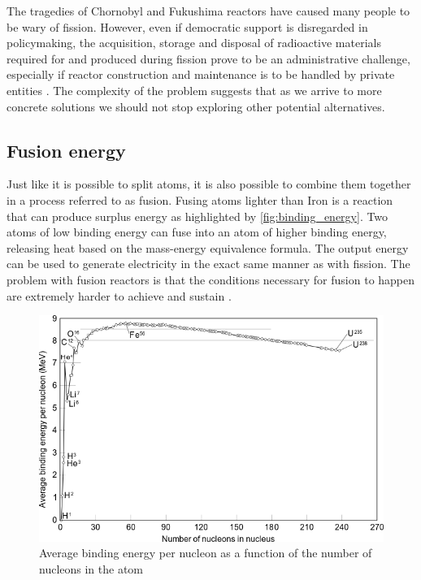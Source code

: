   The tragedies of Chornobyl and Fukushima reactors
  have caused many people to be wary of fission. However, even if
  democratic support is disregarded in policymaking, the acquisition,
  storage and disposal of radioactive materials required for and produced 
  during fission prove to be an administrative challenge, especially 
  if reactor construction and maintenance is to be handled
  by private entities \cite{fission_tech_and_current_issues}. 
  The complexity of the problem suggests that 
  as we arrive to more concrete solutions we 
  should not stop exploring other potential alternatives.

\subsection{Fusion energy}

  Just like it is possible to split atoms, it is also possible to
  combine them together in a process referred to as fusion. 
  Fusing atoms lighter than Iron is a reaction that 
  can produce surplus energy as highlighted by \autoref{fig:binding_energy}.
  Two atoms of low binding energy can fuse into an atom of higher 
  binding energy, releasing heat based on the mass-energy equivalence formula.
  The output energy can be used to generate electricity in
  the exact same manner as with fission. 
  The problem with fusion reactors is that the conditions necessary
  for fusion to happen are extremely harder to achieve and sustain 
  \cite{structural_materials_fusion}.
	\begin{figure}[H]
	  \centering
	  \includegraphics[width=.90\linewidth]{media/binding_energy.png}
	  \caption{Average binding energy per nucleon as a function of the number of nucleons in the atom}
	  \label{fig:binding_energy}
	\end{figure}

